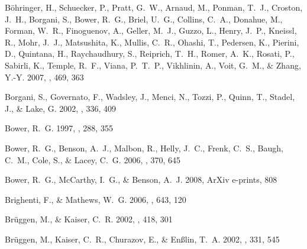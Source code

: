 \documentclass[12pt,preprint]{aastex}
\begin{document}
\begin{thebibliography}{138}
{B{\"o}hringer}, H., {Schuecker}, P., {Pratt}, G.~W., {Arnaud}, M., {Ponman},
  T.~J., {Croston}, J.~H., {Borgani}, S., {Bower}, R.~G., {Briel}, U.~G.,
  {Collins}, C.~A., {Donahue}, M., {Forman}, W.~R., {Finoguenov}, A., {Geller},
  M.~J., {Guzzo}, L., {Henry}, J.~P., {Kneissl}, R., {Mohr}, J.~J.,
  {Matsushita}, K., {Mullis}, C.~R., {Ohashi}, T., {Pedersen}, K., {Pierini},
  D., {Quintana}, H., {Raychaudhury}, S., {Reiprich}, T.~H., {Romer}, A.~K.,
  {Rosati}, P., {Sabirli}, K., {Temple}, R.~F., {Viana}, P.~T.~P., {Vikhlinin},
  A., {Voit}, G.~M., \& {Zhang}, Y.-Y. 2007, \aap, 469, 363

{Borgani}, S., {Governato}, F., {Wadsley}, J., {Menci}, N., {Tozzi}, P.,
  {Quinn}, T., {Stadel}, J., \& {Lake}, G. 2002, \mnras, 336, 409

{Bower}, R.~G. 1997, \mnras, 288, 355

{Bower}, R.~G., {Benson}, A.~J., {Malbon}, R., {Helly}, J.~C., {Frenk}, C.~S.,
  {Baugh}, C.~M., {Cole}, S., \& {Lacey}, C.~G. 2006, \mnras, 370, 645

{Bower}, R.~G., {McCarthy}, I.~G., \& {Benson}, A.~J. 2008, ArXiv e-prints, 808

{Brighenti}, F., \& {Mathews}, W.~G. 2006, \apj, 643, 120

{Br{\"u}ggen}, M., \& {Kaiser}, C.~R. 2002, \nat, 418, 301

{Br{\"u}ggen}, M., {Kaiser}, C.~R., {Churazov}, E., \& {En{\ss}lin}, T.~A.
  2002, \mnras, 331, 545


\end{thebibliography}
\end{document}
